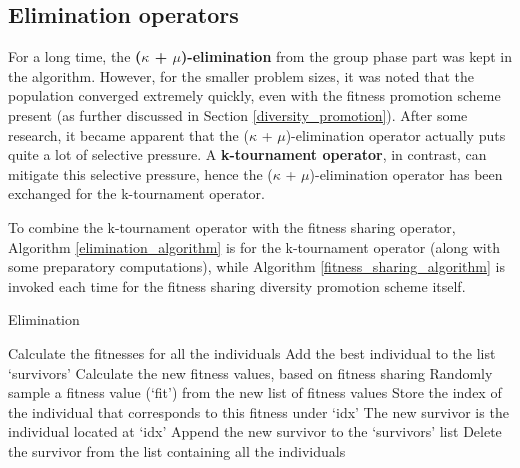 \documentclass[a4paper,10pt]{article}
\newcommand{\ReplaceMe}[1]{{\color{blue}#1}}
\begin{document}
\subsection{Elimination operators}
\label{elimination}
For a long time, the \textbf{($\kappa$ + $\mu$)-elimination} from the group phase part was kept in the algorithm. However, for the smaller problem sizes, it was noted that the population converged extremely quickly, even with the fitness promotion scheme present (as further discussed in Section \ref{diversity_promotion}). After some research, it became apparent that the ($\kappa$ + $\mu$)-elimination operator actually puts quite a lot of selective pressure. A \textbf{k-tournament operator}, in contrast, can mitigate this selective pressure, hence the ($\kappa$ + $\mu$)-elimination operator has been exchanged for the k-tournament operator.

To combine the k-tournament operator with the fitness sharing operator, Algorithm \ref{elimination_algorithm} is for the k-tournament operator (along with some preparatory computations), while Algorithm \ref{fitness_sharing_algorithm} is invoked each time for the fitness sharing diversity promotion scheme itself.

\begin{algorithm}
\caption{Elimination \cite{eiben_smith}}\label{elimination_algorithm}
\begin{algorithmic}
\State Calculate the fitnesses for all the individuals
\State Add the best individual to the list `survivors'
\State Calculate the new fitness values, based on fitness sharing
\State Randomly sample a fitness value (`fit') from the new list of fitness values
\State Store the index of the individual that corresponds to this fitness under `idx'
\EndIf
\EndFor
\State The new survivor is the individual located at `idx'
\State Append the new survivor to the `survivors' list
\State Delete the survivor from the list containing all the individuals
\EndFor
\end{algorithmic}
\end{algorithm}
\end{document}
